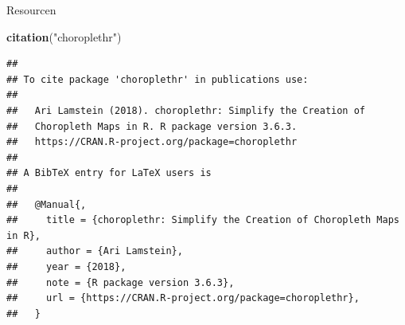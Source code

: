 \documentclass[ignorenonframetext,]{beamer}
\newenvironment{Shaded}{\begin{snugshade}}{\end{snugshade}}
\newcommand{\KeywordTok}[1]{\textcolor[rgb]{0.13,0.29,0.53}{\textbf{#1}}}
\newcommand{\StringTok}[1]{\textcolor[rgb]{0.31,0.60,0.02}{#1}}
\newcommand{\NormalTok}[1]{#1}
\begin{document}
\begin{frame}[fragile]{Resourcen}

\begin{Shaded}
\begin{Highlighting}[]
\KeywordTok{citation}\NormalTok{(}\StringTok{"choroplethr"}\NormalTok{)}
\end{Highlighting}
\end{Shaded}

\begin{verbatim}
## 
## To cite package 'choroplethr' in publications use:
## 
##   Ari Lamstein (2018). choroplethr: Simplify the Creation of
##   Choropleth Maps in R. R package version 3.6.3.
##   https://CRAN.R-project.org/package=choroplethr
## 
## A BibTeX entry for LaTeX users is
## 
##   @Manual{,
##     title = {choroplethr: Simplify the Creation of Choropleth Maps in R},
##     author = {Ari Lamstein},
##     year = {2018},
##     note = {R package version 3.6.3},
##     url = {https://CRAN.R-project.org/package=choroplethr},
##   }
\end{verbatim}

\end{frame}
\end{document}
